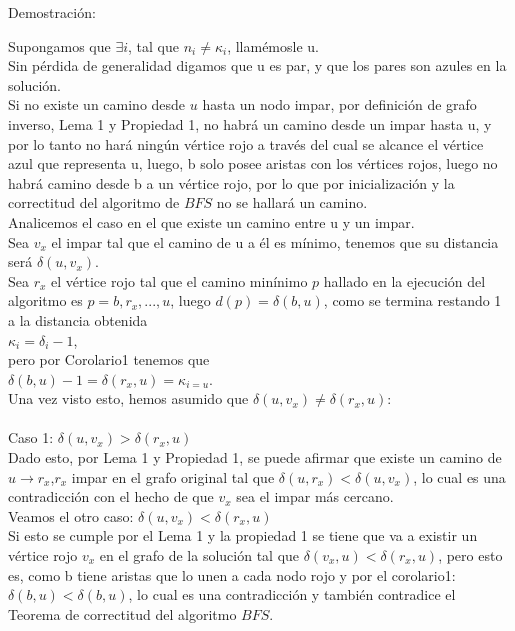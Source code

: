 \documentclass[12pt]{article}
\begin{document}
Demostraci\'on:

Supongamos que $\exists i$, tal que $n_i\neq \kappa_i$, llam\'emosle u.\\
Sin p\'erdida de generalidad digamos que u es par, y que los pares son azules en la soluci\'on.\\
Si no existe un camino desde $u$ hasta un nodo impar, por definici\'on de grafo inverso, Lema 1 y Propiedad 1, no habr\'a un camino desde un impar hasta u, y por lo tanto no har\'a ning\'un v\'ertice rojo a trav\'es del cual se alcance el v\'ertice azul que representa u, luego, b solo posee aristas con los v\'ertices rojos, luego no habr\'a camino desde b a un v\'ertice rojo, por lo que por inicializaci\'on y la correctitud del algoritmo de $BFS$ no se hallar\'a un camino.\\
Analicemos el caso en el que existe un camino entre u y un impar.\\
Sea $v_x$ el impar tal que el camino de u a \'el es m\'inimo, tenemos que su distancia ser\'a $\delta(u,v_x)$.\\
Sea $r_x$ el v\'ertice rojo tal que el camino min\'inimo $p$ hallado en la ejecuci\'on del algoritmo es $p= b,r_x,...,u$,
luego $d(p) = \delta(b,u)$, como se termina restando 1 a la distancia obtenida \\
$\kappa_i = \delta_i - 1$,\\
 pero por Corolario1 tenemos que \\
 $\delta(b,u)-1 = \delta(r_x,u) = \kappa_{i=u}$.\\
 Una vez visto  esto, hemos asumido que
 $\delta(u,v_x)\neq \delta(r_x,u)$:\\
 \\
 Caso 1:  $\delta(u,v_x)>\delta(r_x,u)$\\
  Dado esto, por Lema 1 y Propiedad 1, se puede afirmar que existe un camino de $u\rightarrow r_x$,$r_x$ impar en el grafo original tal que $\delta(u,r_x)<\delta(u,v_x)$, lo cual es una contradicci\'on con el hecho de que $v_x$ sea el impar m\'as cercano.\\
  Veamos el otro caso: $\delta(u,v_x)<\delta(r_x,u)$\\
  Si esto se cumple por el Lema 1 y la propiedad 1 se tiene que va a existir un v\'ertice rojo $v_x$ en el grafo de la soluci\'on tal que $\delta(v_x,u)<\delta(r_x,u)$, pero esto es, como b tiene aristas que lo unen a cada nodo rojo y por el corolario1:\\
  $\delta(b,u)<\delta(b,u)$, lo cual es una contradicci\'on y tambi\'en contradice el Teorema de correctitud del algoritmo 
  $BFS$.\\
  \\
  
\end{document}

